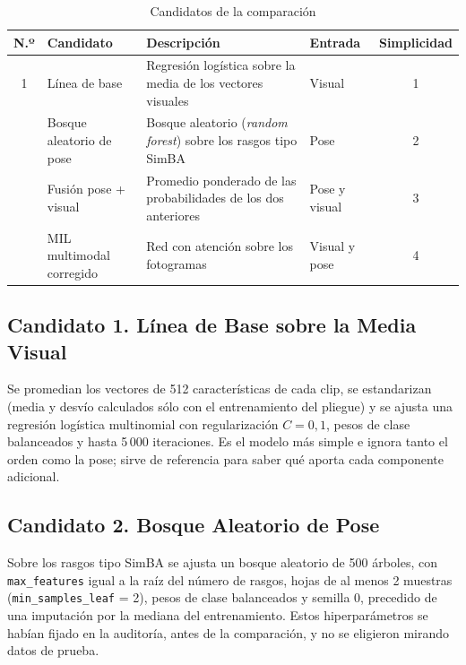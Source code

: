 \begin{table}[H]
\caption{Candidatos de la comparación}\label{tab:c4-candidatos}
{\singlespacing\small
\begin{tabularx}{\textwidth}{@{}clXlc@{}}
\toprule
N.º & Candidato & Descripción & Entrada & Simplicidad \\
\midrule
1 & Línea de base & Regresión logística sobre la media de los \Fotogramas{} vectores visuales & Visual & 1 \\
\addlinespace
2 & Bosque aleatorio de pose & Bosque aleatorio (\textit{random forest}) sobre los \PoseRasgos{} rasgos tipo SimBA & Pose & 2 \\
\addlinespace
3 & Fusión pose + visual & Promedio ponderado de las probabilidades de los dos anteriores & Pose y visual & 3 \\
\addlinespace
4 & MIL multimodal corregido & Red con atención sobre los \Fotogramas{} fotogramas & Visual y pose & 4 \\
\bottomrule
\end{tabularx}}
\end{table}

\subsection{Candidato 1. Línea de Base sobre la Media Visual}
Se promedian los \Fotogramas{} vectores de 512 características de cada clip, se estandarizan (media y desvío calculados sólo con el entrenamiento del pliegue) y se ajusta una regresión logística multinomial con regularización $C = 0{,}1$, pesos de clase balanceados y hasta 5\,000 iteraciones. Es el modelo más simple e ignora tanto el orden como la pose; sirve de referencia para saber qué aporta cada componente adicional.

\subsection{Candidato 2. Bosque Aleatorio de Pose}
Sobre los \PoseRasgos{} rasgos tipo SimBA se ajusta un bosque aleatorio \parencite{breiman2001} de 500 árboles, con \texttt{max\_features} igual a la raíz del número de rasgos, hojas de al menos 2 muestras (\texttt{min\_samples\_leaf} = 2), pesos de clase balanceados y semilla 0, precedido de una imputación por la mediana del entrenamiento. Estos hiperparámetros se habían fijado en la auditoría, antes de la comparación, y no se eligieron mirando datos de prueba.


